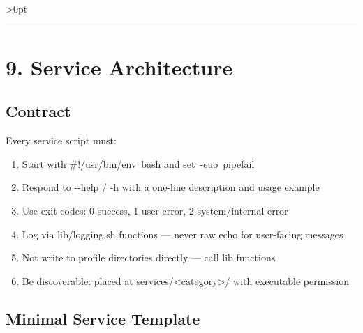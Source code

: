 \documentclass[11pt, a4paper, DIV=14]{scrartcl}
\renewcommand{\texttt}[1]{{\ttfamily\fontsize{8.5}{10.5}\selectfont\color{BabbNavy}#1}}
\providecommand{\tightlist}{\setlength{\itemsep}{2pt}\setlength{\parskip}{0pt}}
\let\origRule\rule
\renewcommand{\rule}[3][0pt]{%
  \ifnum\dimexpr#3\relax>0pt
    \par\vspace{2pt}\noindent{\color{BabbBorder}\origRule[#1]{#2}{#3}}\par\vspace{2pt}%
  \else
    \origRule[#1]{#2}{#3}%
  \fi
}
\begin{document}
\begin{center}\rule{0.5\linewidth}{0.5pt}\end{center}

\section{9. Service Architecture}\label{service-architecture}

\subsection{Contract}\label{contract}

Every service script must:

\begin{enumerate}
\def\labelenumi{\arabic{enumi}.}
\tightlist
\item
  Start with \texttt{\#!/usr/bin/env\ bash} and
  \texttt{set\ -euo\ pipefail}
\item
  Respond to \texttt{-\/-help} / \texttt{-h} with a one-line description
  and usage example
\item
  Use exit codes: \texttt{0} success, \texttt{1} user error, \texttt{2}
  system/internal error
\item
  Log via \texttt{lib/logging.sh} functions --- never raw \texttt{echo}
  for user-facing messages
\item
  Not write to profile directories directly --- call lib functions
\item
  Be discoverable: placed at
  \texttt{services/\textless{}category\textgreater{}/} with executable
  permission
\end{enumerate}

\subsection{Minimal Service Template}\label{minimal-service-template}
\end{document}
